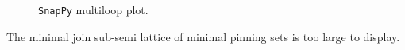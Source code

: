 \documentclass{article}%
\begin{document}
\begin{multicols}{2}
\begin{figure}[H]
\centering

\caption{\texttt{SnapPy} multiloop plot.}
\label{fig:tex/img/[(5, 8, 6, 9), (2, 12, 3, 11), (1, 16, 2, 17), (12, 16, 13, 15), (4, 20, 5, 19), (9, 18, 10, 19), (6, 22, 7, 21), (7, 22, 8, 23), (20, 24, 21, 23), (3, 24, 4, 25), (10, 26, 11, 25), (17, 26, 18, 27), .svg}
\end{figure}
\columnbreak

The minimal join sub-semi lattice of minimal pinning sets is too large to display.\end{multicols}

\newpage
\end{document}
